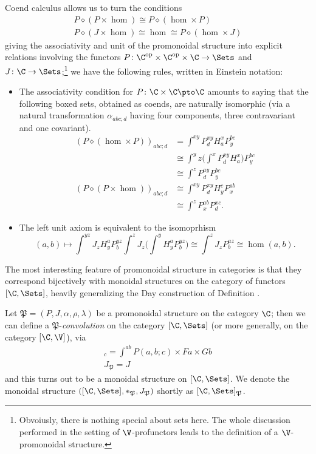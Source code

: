 \begin{remark}
Coend calculus allows us to turn the conditions
\begin{gather}
P\diamond (P\times\hom) \cong P\diamond (\hom\times P)\\
P\diamond (J\times\hom) \cong\hom \cong P\diamond (\hom\times J)
\end{gather}
giving the associativity and unit of the promonoidal structure into explicit relations involving the functors $P\colon \C^\text{op}\times\C^\text{op}\times \C\to \Sets$ and $J\colon \C\to \Sets$;\footnote{Obvoiusly, there is nothing special about sets here. The whole discussion performed in the setting of $\V$-profunctors leads to the definition of a $\V$-promonoidal structure.} we have the following rules, written in Einstein notation:
\begin{itemize}
\item The associativity condition for $P\colon \C\times\C\pto \C$ amounts to saying that the following boxed sets, obtained as coends, are naturally isomorphic (via a natural transformation $\alpha_{abc;d}$ having four components, three contravariant and one covariant).
\begin{align*}
\textstyle (P\diamond (\hom\times P))_{abc;d} & =\textstyle \int^{xy} P_d^{xy}H_a^x P_y^{bc}\\
&\textstyle \cong \int^yz\big(\int^x P_d^{xy}H_a^x \big) P_y^{bc}\\
&\cong \boxed{\textstyle \int^z P_d^{ay}P_y^{bc}}\\
(P\diamond(P\times\hom))_{abc;d} &\cong \textstyle \int^{xy} P_d^{xy} H_y^c P_x^{ab}\\
&\cong \boxed{\textstyle \int^z P_x^{ab} P_d^{xc}}.
\end{align*}
\item The left unit axiom is equivalent to the isomoprhism
\[
(a,b) \mapsto \textstyle \int^{yz} J_z H^a_y P^{yz}_b \int^z J_z\big( \int^y H^a_y P^{yz}_b \big) \cong \int^z J_z P^{az}_b \cong \hom(a,b).
\]
\end{itemize}
\end{remark}
The most interesting feature of promonoidal structure in categories is that they correspond bijectively with monoidal structures on the category of functors $[\C, \Sets]$, heavily generalizing the Day construction of Definition .
\begin{proposition}\label{promonoshit}
Let $\mathfrak P = (P, J,\alpha, \rho,\lambda)$ be a promonoidal structure on the category $\C$; then we can define a $\mathfrak P$-\emph{convolution} on the category $[\C,\Sets]$ (or more generally, on the category $[\C,\V]$), via
\begin{gather}
[F\ast_{\mathfrak P} G]_c = \int^{ab} P(a,b;c)\times Fa\times Gb\\
J_{\mathfrak P} = J
\end{gather}
and this turns out to be a monoidal structure on $[\C,\Sets]$. We denote the monoidal structure $([\C,\Sets], \ast_{\mathfrak P}, J_{\mathfrak P})$ shortly as $[\C,\Sets]_{\mathfrak P}$.
\end{proposition}
